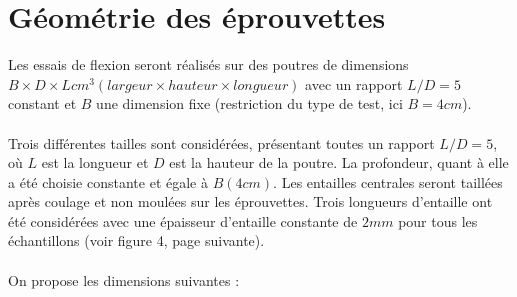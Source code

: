 \documentclass[12pt]{report}
\begin{document}
\section{Géométrie des éprouvettes}
Les essais de flexion seront réalisés sur des poutres de dimensions $B\times D\times L{} cm^3 (largeur \times{} hauteur
\times{} longueur)$ avec un rapport $L/D=5$ constant et $B$ une dimension fixe (restriction du type de test,
ici $B=4 cm$).
\\\\
Trois différentes tailles sont considérées, présentant toutes un rapport $L/D = 5$, où $L$ est la
longueur et $D$ est la hauteur de la poutre. La profondeur, quant à elle a été choisie constante et
égale à $B (4 cm)$. Les entailles centrales seront taillées après coulage et non moulées sur les
éprouvettes. Trois longueurs d’entaille ont été considérées avec une épaisseur d’entaille
constante de $2 mm$ pour tous les échantillons (voir figure 4, page suivante).
\\\\
On propose les dimensions suivantes :
\end{document}
